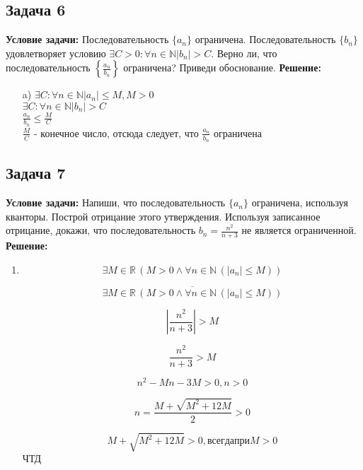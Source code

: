 \documentclass[a4paper,12pt]{article}
\begin{document}
\subsection{Задача 6}
\textbf{Условие задачи:}
Последовательность \(\{a_n\}\) ограничена. Последовательность \(\{b_n\}\) удовлетворяет условию \( \exists C > 0 : \forall n \in \mathbb{N} |b_n| > C \). Верно ли, что последовательность \( \left\{ \frac{a_n}{b_n} \right\} \) ограничена? Приведи обоснование.
\textbf{Решение:}
\begin{itemize}
    \item[a)] $\exists C:  \forall n \in \mathbb{N} |a_n| \le M, M > 0$\\
    $\exists C: \forall n \in \mathbb{N} |b_n| > C$\\
    $\frac{a_n}{b_n}\le \frac{M}{C}$\\
    $\frac{M}{C}$ - конечное число, отсюда следует, что $\frac{a_n}{b_n}$ ограничена
\end{itemize}
\vspace{1cm}

\subsection{Задача 7}
\textbf{Условие задачи:}
Напиши, что последовательность \( \{a_n\} \) ограничена, используя кванторы. Построй отрицание этого утверждения. Используя записанное отрицание, докажи, что последовательность \(b_n = \frac{n^2}{n+3}\) не является ограниченной.
\textbf{Решение:}
\begin{enumerate}
    \item \[
    \exists M \in \mathbb{R} \, \left( M > 0 \land \forall n \in \mathbb{N} \, (|a_n| \leq M) \right)
    \]
    
    \[
    \overline{\exists M \in \mathbb{R} \, \left( M > 0 \land \forall n \in \mathbb{N} \, (|a_n| \leq M) \right)}
    \]

    \[
    |\frac{n^2}{n+3}| > M
    \]
    
    \[
    \frac{n^2}{n+3} > M
    \]

    \[
    n^2-Mn-3M>0, n>0
    \]

    \[
    n=\frac{M+\sqrt{M^2+12M}}{2}>0
    \]

    \[
    M+\sqrt{M^2+12M}>0, всегда при M>0
    \]
    ЧТД
    
\end{enumerate}

\vspace{1cm}
\end{document}
